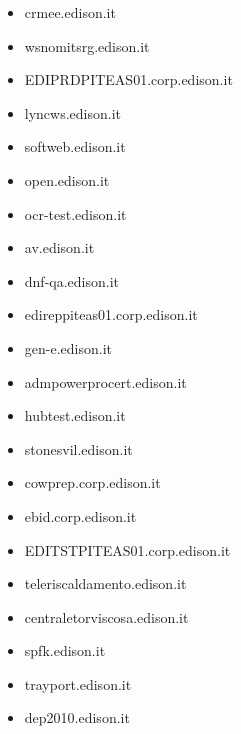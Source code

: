 \documentclass{article}
\begin{document}
\begin{itemize}
        \item crmee.edison.it
    
        \item wsnomitsrg.edison.it
    
        \item EDIPRDPITEAS01.corp.edison.it
    
        \item lyncws.edison.it
    
        \item softweb.edison.it
    
        \item open.edison.it
    
        \item ocr-test.edison.it
    
        \item av.edison.it
    
        \item dnf-qa.edison.it
    
        \item edireppiteas01.corp.edison.it
    
        \item gen-e.edison.it
    
        \item admpowerprocert.edison.it
    
        \item hubtest.edison.it
    
        \item stonesvil.edison.it
    
        \item cowprep.corp.edison.it
    
        \item ebid.corp.edison.it
    
        \item EDITSTPITEAS01.corp.edison.it
    
        \item teleriscaldamento.edison.it
    
        \item centraletorviscosa.edison.it
    
        \item spfk.edison.it
    
        \item trayport.edison.it
    
        \item dep2010.edison.it
    

\end{itemize}
\end{document}
